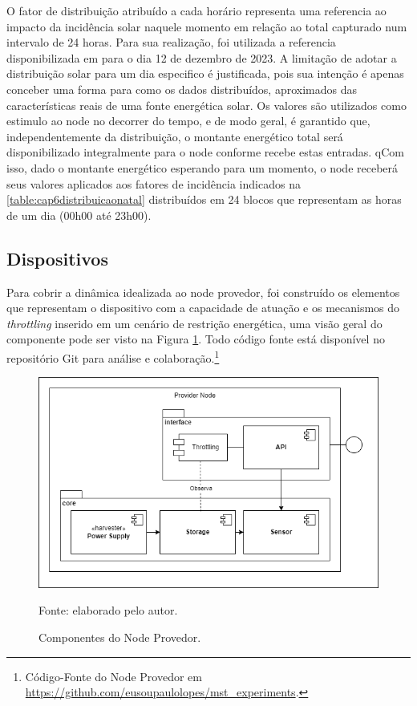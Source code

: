 O fator de distribuição atribuído a cada horário representa uma referencia ao impacto da incidência solar naquele momento em relação ao total capturado num intervalo de 24 horas. Para sua realização, foi utilizada a referencia disponibilizada em  para o dia 12 de dezembro de 2023. A limitação de adotar a distribuição solar para um dia especifico é justificada, pois sua intenção é apenas conceber uma forma para como os dados distribuídos, aproximados das características reais de uma fonte energética solar. Os valores são utilizados como estimulo ao node no decorrer do tempo, e de modo geral, é garantido que, independentemente da distribuição, o montante energético total será disponibilizado integralmente para o node conforme recebe estas entradas. qCom isso, dado o montante energético esperando para um momento, o node receberá seus valores aplicados aos fatores de incidência indicados na  \ref{table:cap6distribuicaonatal} distribuídos em 24 blocos que representam as horas de um dia (00h00 até 23h00).



\subsection{Dispositivos}

Para cobrir a dinâmica idealizada ao node provedor, foi construído os elementos que representam o dispositivo com a capacidade de atuação e os mecanismos do \textit{throttling} inserido em um cenário de restrição energética, uma visão geral do componente pode ser visto na Figura \ref{fig:cap6providernode}. Todo código fonte está disponível no repositório Git para análise e colaboração.\footnote{Código-Fonte do Node Provedor em \url{https://github.com/eusoupaulolopes/mst_experiments}.} 

\begin{figure}[H]
	\centering
	
	\caption{Componentes do Node Provedor.}
	\label{fig:cap6providernode}
	\noindent\includegraphics[width=0.75\linewidth]{Imagens/cap6/cap6providernode.png} 
	
	Fonte: elaborado pelo autor.
\end{figure}

